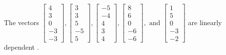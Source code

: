 \begin{exercise}
\begin{exerciseStatement}
  \end{exerciseStatement}
  \begin{exerciseAnswer}
   The vectors \(\left[\begin{array}{r}
4 \\
3 \\
0 \\
-3 \\
-3
\end{array}\right] , \left[\begin{array}{r}
3 \\
3 \\
5 \\
-5 \\
5
\end{array}\right] , \left[\begin{array}{r}
-5 \\
-4 \\
4 \\
3 \\
4
\end{array}\right] , \left[\begin{array}{r}
8 \\
6 \\
0 \\
-6 \\
-6
\end{array}\right] , \text{ and } \left[\begin{array}{r}
1 \\
5 \\
0 \\
-3 \\
-2
\end{array}\right]\) are 
  	 linearly dependent  .
  


  \end{exerciseAnswer}
\end{exercise}
